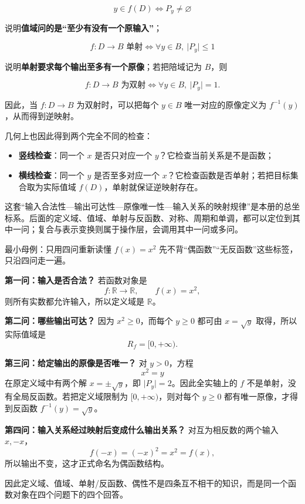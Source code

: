 \documentclass[11pt,a4paper]{ctexart}
\providecommand{\tightlist}{}
\begin{document}
\[
\boxed{
y\in f(D)
\Longleftrightarrow
P_y\ne\varnothing
}
\]

说明\textbf{值域问的是``至少有没有一个原输入''}；

\[
\boxed{
f:D\to B\text{ 单射}
\Longleftrightarrow
\forall y\in B,\ \lvert P_y\rvert\le1
}
\]

说明\textbf{单射要求每个输出至多有一个原像}；若把陪域记为 \(B\)，则

\[
\boxed{
f:D\to B\text{ 为双射}
\Longleftrightarrow
\forall y\in B,\ \lvert P_y\rvert=1.
}
\]

因此，当 $f:D\to B$ 为双射时，可以把每个 $y\in B$ 唯一对应的原像定义为 $f^{-1}(y)$，从而得到逆映射。

几何上也因此得到两个完全不同的检查：

\begin{itemize}
\tightlist
\item
  \textbf{竖线检查}：同一个 \(x\) 是否只对应一个 \(y\)？它检查当前关系是不是函数；
\item
  \textbf{横线检查}：同一个 \(y\) 是否至多对应一个 \(x\)？它检查函数是否单射；若把目标集合取为实际值域 \(f(D)\)，单射就保证逆映射存在。
\end{itemize}

这套``输入合法性—输出可达性—原像唯一性—输入关系的映射规律''是本册的总坐标系。后面的定义域、值域、单射与反函数、对称、周期和单调，都可以定位到其中一问；复合与表示变换则属于操作层，会调用其中一问或多问。

\begin{examplebox}{最小母例：只用四问重新读懂 \(f(x)=x^2\)}
先不背“偶函数”“无反函数”这些标签，只沿四问走一遍。

\textbf{第一问：输入是否合法？} 若函数对象是
\[
f:\mathbb R\to\mathbb R,\qquad f(x)=x^2,
\]
则所有实数都允许输入，所以定义域是 \(\mathbb R\)。

\textbf{第二问：哪些输出可达？} 因为 \(x^2\ge0\)，而每个 \(y\ge0\) 都可由 \(x=\sqrt y\) 取得，所以实际值域是
\[
R_f=[0,+\infty).
\]

\textbf{第三问：给定输出的原像是否唯一？} 对 \(y>0\)，方程
\[
x^2=y
\]
在原定义域中有两个解 \(x=\pm\sqrt y\)，即 \(\lvert P_y\rvert=2\)。因此全实轴上的 \(f\) 不是单射，没有全局反函数。若把定义域限制为 \([0,+\infty)\)，则对每个 \(y\ge0\) 都有唯一原像，才得到反函数 \(f^{-1}(y)=\sqrt y\)。

\textbf{第四问：输入关系经过映射后变成什么输出关系？} 对互为相反数的两个输入 \(x,-x\)，
\[
f(-x)=(-x)^2=x^2=f(x),
\]
所以输出不变，这才正式命名为偶函数结构。

因此定义域、值域、单射/反函数、偶性不是四条互不相干的知识，而是同一个函数对象在四个问题下的四个回答。
\end{examplebox}
\end{document}

